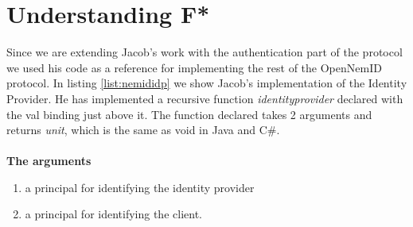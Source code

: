 \documentclass[twosided]{report}
\begin{document}
\section{Understanding F*}
Since we are extending Jacob's work with the authentication part of the protocol we used his code as a reference for implementing the rest of the OpenNemID protocol. In listing \ref{list:nemididp} we show Jacob's implementation of the Identity Provider. He has implemented a recursive function \emph{identityprovider} declared with the val binding just above it. The function declared takes 2 arguments and returns \emph{unit}, which is the same as void in Java and C\#.
\\
\\
\textbf{The arguments}
\begin{enumerate}
\item a principal for identifying the identity provider
\item a principal for identifying the client.
\end{enumerate}
\clearpage
\end{document}
